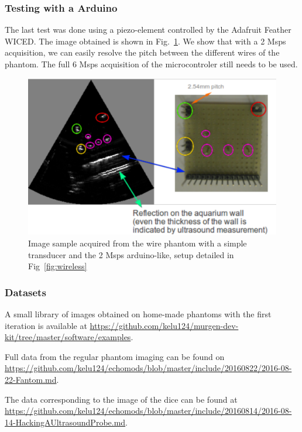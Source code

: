 \documentclass[letterpaper, 10 pt, conference]{ieeeconf} %
\begin{document}
\subsubsection{Testing with a Arduino}

The last test was done using a piezo-element controlled by the Adafruit Feather WICED. The image obtained is shown in Fig.~\ref{fig:wirelessimage}. We show that with a 2 Msps acquisition, we can easily resolve the pitch between the different wires of the phantom. The full 6 Msps acquisition of the microcontroler still needs to be used.

\begin{figure}%
\centering
\includegraphics[width=.98\linewidth]{wireless}
\caption{Image sample acquired from the wire phantom with a simple transducer and the 2 Msps arduino-like, setup detailed in Fig~\ref{fig:wireless}}
\label{fig:wirelessimage}
\end{figure}


\subsubsection{Datasets}

A small library of images obtained on home-made phantoms with the first iteration is available at \url{https://github.com/kelu124/murgen-dev-kit/tree/master/software/examples}.

Full data from the regular phantom imaging can be found on \url{https://github.com/kelu124/echomods/blob/master/include/20160822/2016-08-22-Fantom.md}.

The data corresponding to the image of the dice can be found at \url{https://github.com/kelu124/echomods/blob/master/include/20160814/2016-08-14-HackingAUltrasoundProbe.md}. 
\end{document}
